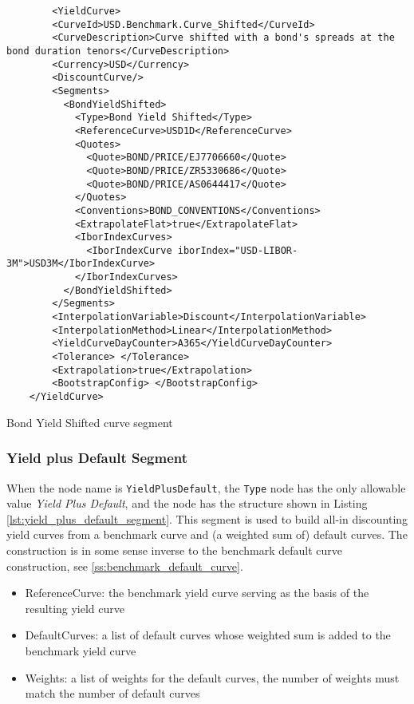   \begin{listing}[H]
    \begin{verbatim}
        <YieldCurve>
        <CurveId>USD.Benchmark.Curve_Shifted</CurveId>
        <CurveDescription>Curve shifted with a bond's spreads at the bond duration tenors</CurveDescription>
        <Currency>USD</Currency>
        <DiscountCurve/>
        <Segments>
          <BondYieldShifted>
            <Type>Bond Yield Shifted</Type>
            <ReferenceCurve>USD1D</ReferenceCurve>
            <Quotes>
              <Quote>BOND/PRICE/EJ7706660</Quote>
              <Quote>BOND/PRICE/ZR5330686</Quote>
              <Quote>BOND/PRICE/AS0644417</Quote>
            </Quotes>
            <Conventions>BOND_CONVENTIONS</Conventions>
            <ExtrapolateFlat>true</ExtrapolateFlat>
            <IborIndexCurves>
              <IborIndexCurve iborIndex="USD-LIBOR-3M">USD3M</IborIndexCurve>
            </IborIndexCurves>
          </BondYieldShifted>
        </Segments>
        <InterpolationVariable>Discount</InterpolationVariable>
        <InterpolationMethod>Linear</InterpolationMethod>
        <YieldCurveDayCounter>A365</YieldCurveDayCounter>
        <Tolerance> </Tolerance>
        <Extrapolation>true</Extrapolation>
        <BootstrapConfig> </BootstrapConfig>
    </YieldCurve>
    \end{verbatim}
    \caption{Bond Yield Shifted curve segment}
    \label{lst:bond_yield_shifted}
    \end{listing}


\subsubsection*{Yield plus Default Segment}
\label{sec:yield_plus_default}

When the node name is \lstinline!YieldPlusDefault!, the \lstinline!Type! node has the only allowable value \emph{Yield
 Plus Default}, and the node has the structure shown in Listing \ref{lst:yield_plus_default_segment}. This segment is
used to build all-in discounting yield curves from a benchmark curve and (a weighted sum of) default curves. The
construction is in some sense inverse to the benchmark default curve construction, see \ref{ss:benchmark_default_curve}.

\begin{itemize}
\item ReferenceCurve: the benchmark yield curve serving as the basis of the resulting yield curve
\item DefaultCurves: a list of default curves whose weighted sum is added to the benchmark yield curve
\item Weights: a list of weights for the default curves, the number of weights must match the number of default curves
\end{itemize}

